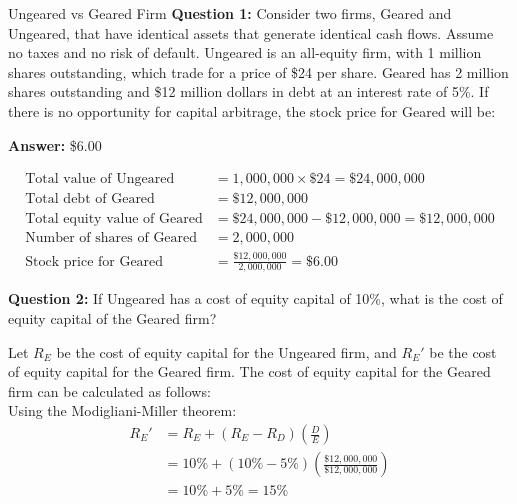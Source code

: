 \begin{examplebox}{Ungeared vs Geared Firm}
    \textbf{Question 1:} Consider two firms, Geared and Ungeared, that have identical assets that generate identical cash flows. Assume no taxes and no risk of default. Ungeared is an all-equity firm, with 1 million shares outstanding, which trade for a price of \$24 per share. Geared has 2 million shares outstanding and \$12 million dollars in debt at an interest rate of 5\%. If there is no opportunity for capital arbitrage, the stock price for Geared will be:
    
    \textbf{Answer:} \$6.00
    

    \begin{align*}
    \text{Total value of Ungeared} &= 1,000,000 \times \$24 = \$24,000,000 \\
    \text{Total debt of Geared} &= \$12,000,000 \\
    \text{Total equity value of Geared} &= \$24,000,000 - \$12,000,000 = \$12,000,000 \\
    \text{Number of shares of Geared} &= 2,000,000 \\
    \text{Stock price for Geared} &= \frac{\$12,000,000}{2,000,000} = \$6.00
    \end{align*}
    
    \textbf{Question 2:} If Ungeared has a cost of equity capital of 10\%, what is the cost of equity capital of the Geared firm?
    

    
    Let \( R_E \) be the cost of equity capital for the Ungeared firm, and \( R_E' \) be the cost of equity capital for the Geared firm. The cost of equity capital for the Geared firm can be calculated as follows:\\

    Using the Modigliani-Miller theorem:
    \begin{align*}
    R_E' &= R_E + (R_E - R_D) \left(\frac{D}{E}\right) \\
         &= 10\% + (10\% - 5\%) \left(\frac{\$12,000,000}{\$12,000,000}\right) \\
         &= 10\% + 5\% = 15\%
    \end{align*}
    
\end{examplebox}

